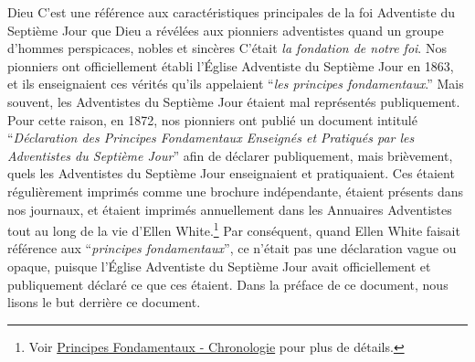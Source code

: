 Dieu  C'est une référence aux caractéristiques principales de la foi Adventiste du Septième Jour que Dieu a révélées aux pionniers adventistes  quand un groupe d'hommes perspicaces, nobles et sincères  C'était \textit{la fondation de notre foi}. Nos pionniers ont officiellement établi l'Église Adventiste du Septième Jour en 1863, et ils enseignaient ces vérités qu'ils appelaient “\textit{les principes fondamentaux}.” Mais souvent, les Adventistes du Septième Jour étaient mal représentés publiquement. Pour cette raison, en 1872, nos pionniers ont publié un document intitulé “\textit{Déclaration des Principes Fondamentaux Enseignés et Pratiqués par les Adventistes du Septième Jour}” afin de déclarer publiquement, mais brièvement, quels  les Adventistes du Septième Jour enseignaient et pratiquaient. Ces  étaient régulièrement imprimés comme une brochure indépendante, étaient présents dans nos journaux, et étaient imprimés annuellement dans les Annuaires Adventistes tout au long de la vie d'Ellen White.\footnote{Voir \hyperref[appendix:timeline]{Principes Fondamentaux - Chronologie} pour plus de détails.} Par conséquent, quand Ellen White faisait référence aux “\textit{principes fondamentaux}”, ce n'était pas une déclaration vague ou opaque, puisque l'Église Adventiste du Septième Jour avait officiellement et publiquement déclaré ce que ces  étaient. Dans la préface de ce document, nous lisons le but derrière ce document.




